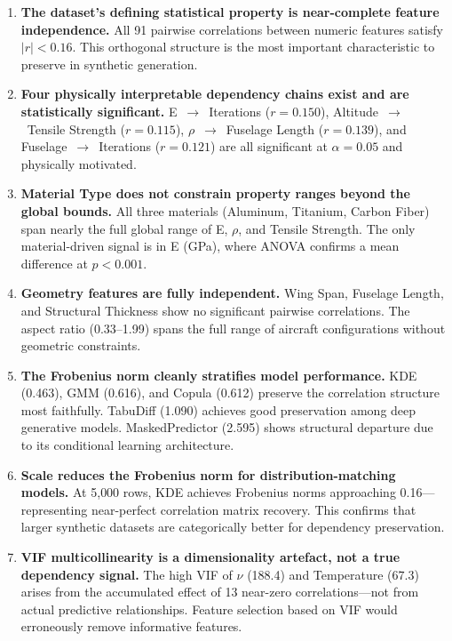 \documentclass[11pt, a4paper]{report}
\begin{document}
\begin{enumerate}[leftmargin=*, itemsep=8pt]

\item \textbf{The dataset's defining statistical property is near-complete feature independence.}
All 91 pairwise correlations between numeric features satisfy $|r| < 0.16$. This orthogonal structure is the most important characteristic to preserve in synthetic generation.

\item \textbf{Four physically interpretable dependency chains exist and are statistically significant.}
E~$\to$~Iterations ($r = 0.150$), Altitude~$\to$~Tensile Strength ($r = 0.115$), $\rho$~$\to$~Fuselage Length ($r = 0.139$), and Fuselage~$\to$~Iterations ($r = 0.121$) are all significant at $\alpha = 0.05$ and physically motivated.

\item \textbf{Material Type does not constrain property ranges beyond the global bounds.}
All three materials (Aluminum, Titanium, Carbon Fiber) span nearly the full global range of E, $\rho$, and Tensile Strength. The only material-driven signal is in E (GPa), where ANOVA confirms a mean difference at $p < 0.001$.

\item \textbf{Geometry features are fully independent.}
Wing Span, Fuselage Length, and Structural Thickness show no significant pairwise correlations. The aspect ratio (0.33--1.99) spans the full range of aircraft configurations without geometric constraints.

\item \textbf{The Frobenius norm cleanly stratifies model performance.}
KDE (0.463), GMM (0.616), and Copula (0.612) preserve the correlation structure most faithfully. TabuDiff (1.090) achieves good preservation among deep generative models. MaskedPredictor (2.595) shows structural departure due to its conditional learning architecture.

\item \textbf{Scale reduces the Frobenius norm for distribution-matching models.}
At 5{,}000 rows, KDE achieves Frobenius norms approaching 0.16---representing near-perfect correlation matrix recovery. This confirms that larger synthetic datasets are categorically better for dependency preservation.

\item \textbf{VIF multicollinearity is a dimensionality artefact, not a true dependency signal.}
The high VIF of $\nu$ (188.4) and Temperature ($67.3$) arises from the accumulated effect of 13 near-zero correlations---not from actual predictive relationships. Feature selection based on VIF would erroneously remove informative features.

\end{enumerate}
\end{document}
